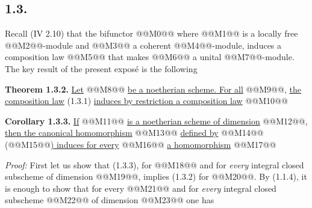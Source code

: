 
\subsection*{1.3.}
Recall (IV 2.10) that the bifunctor
@@M0@@
where @@M1@@ is a locally free @@M2@@-module and @@M3@@ a coherent @@M4@@-module, induces a composition law
@@M5@@
that makes @@M6@@ a unital @@M7@@-module. The key result of the present exposé is the following

\textbf{Theorem 1.3.2.} \uline{Let} @@M8@@ \uline{be a noetherian scheme. For all} @@M9@@, \uline{the composition law} (1.3.1) \uline{induces by restriction a composition law}
@@M10@@

\textbf{Corollary 1.3.3.} \uline{If} @@M11@@ \uline{is a noetherian scheme of dimension} @@M12@@\uline{, then the canonical homomorphism}
@@M13@@
\uline{defined by} @@M14@@ (@@M15@@\uline{) induces for every} @@M16@@ \uline{a homomorphism}
@@M17@@

\emph{Proof:} First let us show that (1.3.3), for @@M18@@ and for \emph{every} integral closed subscheme of dimension @@M19@@, implies (1.3.2) for @@M20@@. By (1.1.4), it is enough to show that for every @@M21@@ and for \emph{every} integral closed subscheme @@M22@@ of dimension @@M23@@ one has

